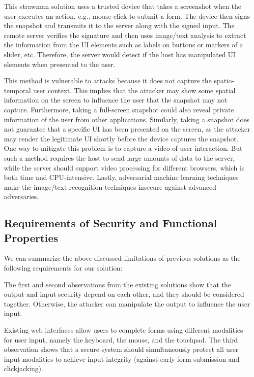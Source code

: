  This strawman solution uses a trusted device that takes a screenshot when the user executes an action, e.g., mouse click to submit a form. The device then signs the snapshot and transmits it to the server along with the signed input. The remote server verifies the signature and then uses image/text analysis to extract the information from the UI elements such as labels on buttons or markers of a slider, etc. Therefore, the server would detect if the host has manipulated UI elements when presented to the user.

This method is vulnerable to attacks because it does not capture the spatio-temporal user context. This implies that the attacker may show some spatial information on the screen to influence the user that the snapshot may not capture. Furthermore, taking a full-screen snapshot could also reveal private information of the user from other applications. Similarly, taking a snapshot does not guarantee that a specific UI has been presented on the screen, as the attacker may render the legitimate UI shortly before the device captures the snapshot.
One way to mitigate this problem is to capture a video of user interaction. But such a method requires the host to send large amounts of data to the server, while the server should support video processing for different browsers, which is both time and CPU-intensive. Lastly, adversarial machine learning techniques~\cite{eykholt2017robust,sitawarin2018rogue} make the image/text recognition techniques insecure against advanced adversaries.


\subsection{Requirements of Security and Functional Properties}
\label{sec:problemStatement:goals}

We can summarize the above-discussed limitations of previous solutions as the following requirements for our solution:

The first and second observations from the existing solutions show that the output and input security depend on each other, and they should be considered together. Otherwise, the attacker can manipulate the output to influence the user input.

Existing web interfaces allow users to complete forms using different modalities for user input, namely the keyboard, the mouse, and the touchpad. The third observation shows that a secure system should simultaneously protect all user input modalities to achieve input integrity (against early-form submission and clickjacking).


